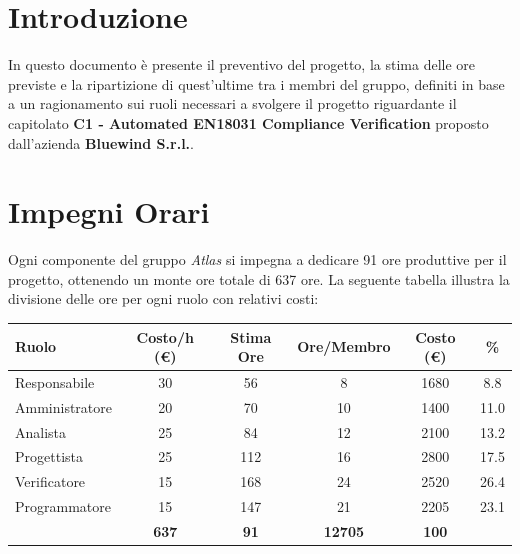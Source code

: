 \documentclass[a4paper,12pt]{article}
\begin{document}
\newpage

\tableofcontents

\newpage

\section{Introduzione}{
    In questo documento è presente il preventivo del progetto, la stima delle ore previste e la ripartizione di quest'ultime tra i membri del gruppo, definiti in base a un ragionamento sui ruoli necessari a svolgere il progetto riguardante il capitolato \textbf{C1 - Automated EN18031 Compliance Verification} proposto dall'azienda \textbf{Bluewind S.r.l.}.
}

\section{Impegni Orari}{
    Ogni componente del gruppo \textit{Atlas} si impegna a dedicare 91 ore produttive per il progetto, ottenendo un monte ore totale di 637 ore. 
    \newline La seguente tabella illustra la divisione delle ore per ogni ruolo con relativi costi:
    \begin{center}
        \begin{tabular}{|l|c|c|c|c|c|}
            \hline
            \rowcolor{gray!20}
            \textbf{Ruolo} & \textbf{Costo/h (€)} & \textbf{Stima Ore} & \textbf{Ore/Membro} & \textbf{Costo (€)} & \textbf{\%} \\
            \hline
            Responsabile & 30 & 56 & 8 & 1680 & 8.8 \\
            \hline
            Amministratore & 20 & 70 & 10 & 1400 & 11.0 \\
            \hline
            Analista & 25 & 84 & 12 & 2100 & 13.2 \\
            \hline
            Progettista & 25 & 112 & 16 & 2800 & 17.5 \\
            \hline
            Verificatore & 15 & 168 & 24 & 2520 & 26.4 \\
            \hline
            Programmatore & 15 & 147 & 21 & 2205 & 23.1 \\
            \hline
            \rowcolor{gray!20}
            \multicolumn{2}{|c|}{\textbf{Totale}} & \textbf{637} & \textbf{91} & \textbf{12705} & \textbf{100} \\
            \hline
        \end{tabular}


\end{center}}
\end{document}
